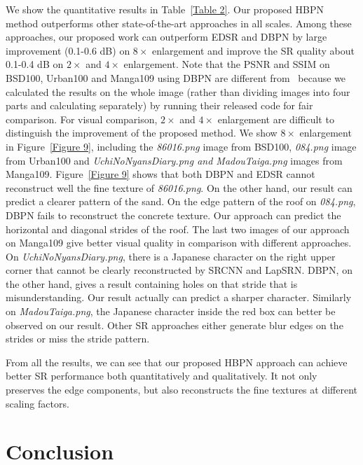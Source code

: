 \documentclass[10pt,twocolumn,letterpaper]{article}
\begin{document}
We show the quantitative results in Table~\ref{Table 2}. Our proposed HBPN method outperforms other state-of-the-art approaches in all scales. Among these approaches, our proposed work can outperform EDSR and DBPN by large improvement (0.1-0.6 dB) on $8\times$ enlargement and improve the SR quality about 0.1-0.4 dB on $2\times$ and $4\times$ enlargement. Note that the PSNR and SSIM on BSD100, Urban100 and Manga109 using DBPN are different from~\cite{DBPN} because we calculated the results on the whole image (rather than dividing images into four parts and calculating separately) by running their released code for fair comparison. For visual comparison, $2\times$ and $4\times$ enlargement are difficult to distinguish the improvement of the proposed method. We show $8\times$ enlargement in Figure~\ref{Figure 9}, including the \textit{86016.png} image from BSD100, \textit{084.png} image from Urban100 and \textit{UchiNoNyansDiary.png and MadouTaiga.png} images from Manga109. Figure~\ref{Figure 9} shows that both DBPN and EDSR cannot reconstruct well the fine texture of \textit{86016.png}. On the other hand, our result can predict a clearer pattern of the sand. On the edge pattern of the roof on \textit{084.png}, DBPN fails to reconstruct the concrete texture. Our approach can predict the horizontal and diagonal strides of the roof. The last two images of our approach on Manga109 give better visual quality in comparison with different approaches. On \textit{UchiNoNyansDiary.png}, there is a Japanese character on the right upper corner that cannot be clearly reconstructed by SRCNN and LapSRN. DBPN, on the other hand, gives a result containing holes on that stride that is misunderstanding. Our result actually can predict a sharper character. Similarly on \textit{MadouTaiga.png}, the Japanese character inside the red box can better be observed on our result. Other SR approaches either generate blur edges on the strides or miss the stride pattern.

From all the results, we can see that our proposed HBPN approach can achieve better SR performance both quantitatively and qualitatively. It not only preserves the edge components, but also reconstructs the fine textures at different scaling factors. 
\section{Conclusion}
\end{document}
